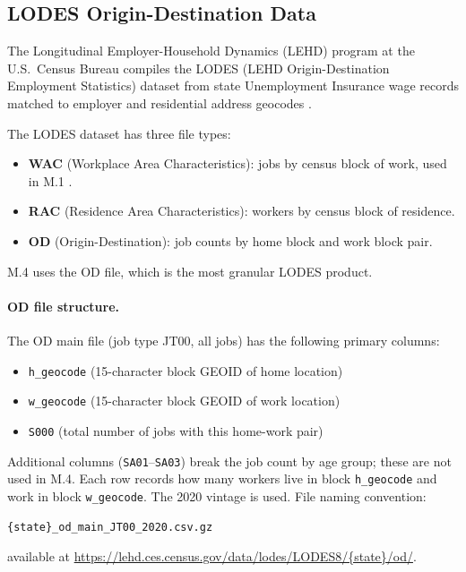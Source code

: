 \label{sec:background}

\subsection{LODES Origin-Destination Data}

The Longitudinal Employer-Household Dynamics (LEHD) program at the U.S.\
Census Bureau compiles the LODES (LEHD Origin-Destination Employment Statistics)
dataset from state Unemployment Insurance wage records matched to employer
and residential address geocodes \citep{abowd2009lodes}.

The LODES dataset has three file types:
\begin{itemize}
  \item \textbf{WAC} (Workplace Area Characteristics): jobs by census block
    of work, used in M.1 \citep{m1econchar}.
  \item \textbf{RAC} (Residence Area Characteristics): workers by census block
    of residence.
  \item \textbf{OD} (Origin-Destination): job counts by home block and work
    block pair.
\end{itemize}
M.4 uses the OD file, which is the most granular LODES product.

\paragraph{OD file structure.}
The OD main file (job type JT00, all jobs) has the following primary columns:
\begin{itemize}
  \item \texttt{h\_geocode} (15-character block GEOID of home location)
  \item \texttt{w\_geocode} (15-character block GEOID of work location)
  \item \texttt{S000} (total number of jobs with this home-work pair)
\end{itemize}
Additional columns (\texttt{SA01}--\texttt{SA03}) break the job count by
age group; these are not used in M.4.
Each row records how many workers live in block \texttt{h\_geocode} and
work in block \texttt{w\_geocode}.
The 2020 vintage is used.
File naming convention:
\begin{center}
  \texttt{\{state\}\_od\_main\_JT00\_2020.csv.gz}
\end{center}
available at
\url{https://lehd.ces.census.gov/data/lodes/LODES8/{state}/od/}.


